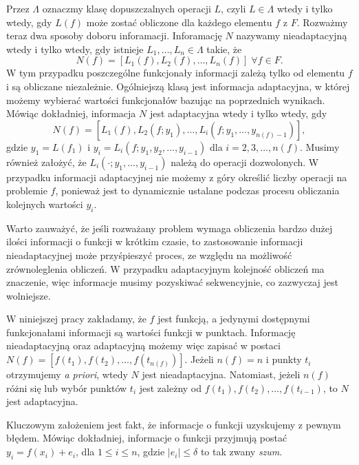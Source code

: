 \documentclass[oik, pdftex, man]{mgrwms}
\begin{document}
    Przez $\Lambda$ oznaczmy klasę dopuszczalnych operacji $L$, czyli $L \in \Lambda$ wtedy i tylko wtedy, gdy $L(f)$ może zostać obliczone dla każdego elementu $f$ z $F$. Rozważmy teraz dwa sposoby doboru inforamacji. Inforamację $N$ nazywamy nieadaptacyjną wtedy i tylko wtedy, gdy istnieje $L_{1}, \ldots, L_{n} \in \Lambda$ takie, że
    \begin{equation*}
        N(f) = \left[ L_{1}(f), L_{2}(f), \ldots, L_{n}(f) \right] \; \forall f \in F.
    \end{equation*}
    W tym przypadku poszczególne funkcjonały informacji zależą tylko od elementu $f$ i są obliczane niezależnie.
    Ogólniejszą klasą jest informacja adaptacyjna, w której możemy wybierać wartości funkcjonałów bazując na poprzednich wynikach. Mówiąc dokładniej, informacja $N$ jest adaptacyjna wtedy i tylko wtedy, gdy
    \begin{equation*}
        N(f) = \left[ L_{1}(f), L_{2}(f; y_{1}), \ldots, L_{i}(f; y_{1}, \ldots, y_{n(f)-1}) \right],
    \end{equation*}
    gdzie $y_{1} = L(f_{1})$ i $y_{i} = L_{i}(f; y_{1}, y_{2}, \ldots, y_{i-1})$ dla $i=2,3,\ldots,n(f)$. Musimy również założyć, że $L_{i}(\cdot;y_{1}, \ldots, y_{i-1})$ należą do operacji dozwolonych. W przypadku informacji adaptacyjnej nie możemy z góry określić liczby operacji na problemie $f$, ponieważ jest to dynamicznie ustalane podczas procesu obliczania kolejnych wartości $y_{i}$.

    Warto zauważyć, że jeśli rozważany problem wymaga obliczenia bardzo dużej ilości informacji o funkcji w krótkim czasie, to zastosowanie informacji nieadaptacyjnej może przyśpieszyć proces, ze względu na możliwość zrównoleglenia obliczeń. W przypadku adaptacyjnym kolejność obliczeń ma znaczenie, więc informacje musimy pozyskiwać sekwencyjnie, co zazwyczaj jest wolniejsze.

    W niniejszej pracy zakładamy, że $f$ jest funkcją, a jedynymi dostępnymi funkcjonałami informacji są wartości funkcji w punktach. Informację nieadaptacyjną oraz adaptacyjną możemy więc zapisać w postaci $N(f) = \left[ f(t_{1}), f(t_{2}), \ldots, f(t_{n(f)}) \right]$. Jeżeli $n(f) = n$ i punkty $t_{i}$ otrzymujemy \textit{a priori}, wtedy $N$ jest nieadaptacyjna. Natomiast, jeżeli $n(f)$ różni się lub wybór punktów $t_{i}$ jest zależny od $f(t_{1}), f(t_{2}), \ldots, f(t_{i-1})$, to $N$ jest adaptacyjna.

    Kluczowym założeniem jest fakt, że informacje o funkcji uzyskujemy z pewnym błędem. Mówiąc dokładniej, informacje o funkcji przyjmują postać $y_{i} = f(x_{i}) + e_{i}$, dla $1 \leq i \leq n$, gdzie $|e_{i}| \leq \delta$ to tak zwany \textit{szum}.
    
\end{document}
